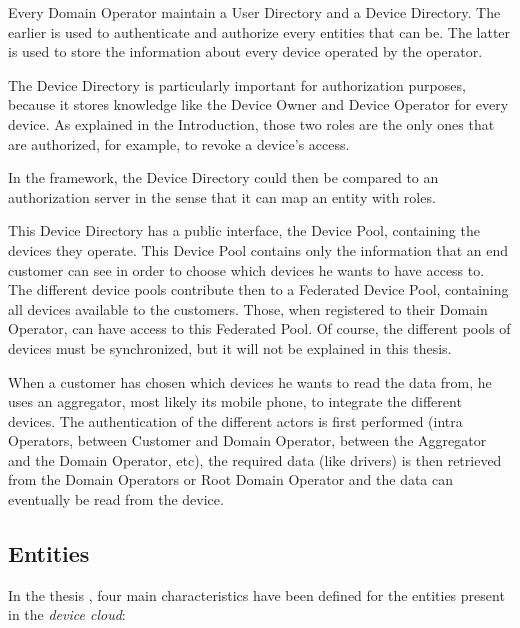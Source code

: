 Every Domain Operator maintain a User Directory and a Device Directory. The earlier is used to authenticate and authorize every entities that can be. The latter is used to store the information about every device operated by the operator.

The Device Directory is particularly important for authorization purposes, because it stores knowledge like the Device Owner and Device Operator for every device. As explained in the Introduction, those two roles are the only ones that are authorized, for example, to revoke a device's access. 

In the framework, the Device Directory could then be compared to an authorization server in the sense that it can map an entity with roles.

This Device Directory has a public interface, the Device Pool, containing the devices they operate. This Device Pool contains only the information that an end customer can see in order to choose which devices he wants to have access to. The different device pools contribute then to a Federated Device Pool, containing all devices available to the customers. Those, when registered to their Domain Operator, can have access to this Federated Pool. Of course, the different pools of devices must be synchronized, but it will not be explained in this thesis.

When a customer has chosen which devices he wants to read the data from, he uses an aggregator, most likely its mobile phone, to integrate the different devices. The authentication of the different actors is first performed (intra Operators, between Customer and Domain Operator, between the Aggregator and the Domain Operator, etc), the required data (like drivers) is then retrieved from the Domain Operators or Root Domain Operator and the data can eventually be read from the device.

 \subsection{Entities}
 \label{sec:02_entities}
 In the thesis , four main characteristics have been defined for the entities present in the \emph{device cloud}:
 
 \pagebreak
 

